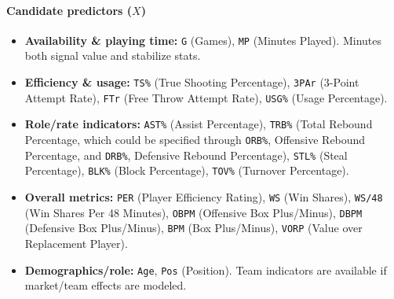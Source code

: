 \documentclass{article}
\theoremstyle{plain}
\theoremstyle{definition}
\theoremstyle{remark}
\begin{document}
\paragraph{Candidate predictors (\(X\))}
\begin{itemize}
    \item \textbf{Availability \& playing time:} \texttt{G} (Games), \texttt{MP} (Minutes Played). Minutes both signal value and stabilize stats.
    \item \textbf{Efficiency \& usage:} \texttt{TS\%} (True Shooting Percentage), \texttt{3PAr} (3-Point Attempt Rate), \texttt{FTr} (Free Throw Attempt Rate), \texttt{USG\%} (Usage Percentage).
    \item \textbf{Role/rate indicators:} \texttt{AST\%} (Assist Percentage), \texttt{TRB\%} (Total Rebound Percentage, which could be specified through \texttt{ORB\%}, Offensive Rebound Percentage, and \texttt{DRB\%}, Defensive Rebound Percentage), \texttt{STL\%} (Steal Percentage), \texttt{BLK\%} (Block Percentage), \texttt{TOV\%} (Turnover Percentage).
    \item \textbf{Overall metrics:} \texttt{PER} (Player Efficiency Rating), \texttt{WS} (Win Shares), \texttt{WS/48} (Win Shares Per 48 Minutes), \texttt{OBPM} (Offensive Box Plus/Minus), \texttt{DBPM} (Defensive Box Plus/Minus), \texttt{BPM} (Box Plus/Minus), \texttt{VORP} (Value over Replacement Player).
    \item \textbf{Demographics/role:} \texttt{Age}, \texttt{Pos} (Position). Team indicators are available if market/team effects are modeled.
\end{itemize}
\end{document}
